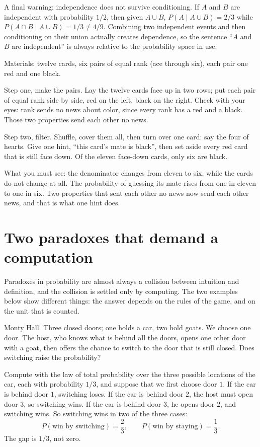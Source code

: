 A final warning: independence does not survive conditioning. If $A$ and $B$ are independent
with probability $1/2$, then given $A\cup B$, $P(A\mid A\cup B)=2/3$
while $P(A\cap B\mid A\cup B)=1/3\neq 4/9$. Combining two independent events and then
conditioning on their union actually creates dependence, so the sentence ``$A$ and $B$ are
independent'' is always relative to the probability space in use.

\begin{tangan}
Materials: twelve cards, six pairs of equal rank (ace through six), each pair one red and
one black.

Step one, make the pairs. Lay the twelve cards face up in two rows; put each pair of equal
rank side by side, red on the left, black on the right. Check with your eyes: rank sends no
news about color, since every rank has a red and a black. Those two properties send each
other no news.

Step two, filter. Shuffle, cover them all, then turn over one card: say the four of hearts.
Give one hint, ``this card's mate is black'', then set aside every red card that is still
face down. Of the eleven face-down cards, only six are black.

What you must see: the denominator changes from eleven to six, while the cards do not change
at all. The probability of guessing its mate rises from one in eleven to one in six. Two
properties that sent each other no news now send each other news, and that is what one hint
does.
\end{tangan}

\section{Two paradoxes that demand a computation}

Paradoxes in probability are almost always a collision between intuition and definition, and
the collision is settled only by computing. The two examples below show different things:
the answer depends on the rules of the game, and on the unit that is counted.


Monty Hall. Three closed doors; one holds a car, two hold goats. We choose one door. The
host, who knows what is behind all the doors, opens one other door with a goat, then offers
the chance to switch to the door that is still closed. Does switching raise the
probability?

Compute with the law of total probability over the three possible locations of the car,
each with probability $1/3$, and suppose that we first choose door $1$. If the car is
behind door $1$, switching loses. If the car is behind door $2$, the host must open door
$3$, so switching wins. If the car is behind door $3$, he opens door $2$, and switching
wins. So switching wins in two of the three cases:
\[
P(\text{win by switching})=\frac{2}{3},\qquad
P(\text{win by staying})=\frac{1}{3}.
\]
The gap is $1/3$, not zero.

